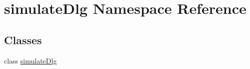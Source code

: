 \hypertarget{namespacesimulate_dlg}{\section{simulate\-Dlg Namespace Reference}
\label{namespacesimulate_dlg}
}
\subsection*{Classes}
\begin{DoxyCompactItemize}
\item 
class \hyperlink{classsimulate_dlg_1_1simulate_dlg}{simulate\-Dlg}
\end{DoxyCompactItemize}
